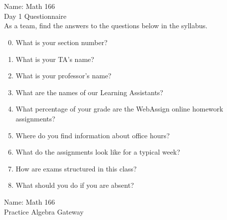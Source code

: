 \documentclass[12pt]{article}
\begin{document}
\pagestyle{empty} %
\section*{}
\noindent Name: \underline{\hspace{2.5 in}}  \hfill Math 166\\
\hfill Day 1 Questionnaire \\


\noindent As a team, find the answers to the questions below in the syllabus. %

\begin{enumerate}
\setcounter{enumi}{-1}
\item What is your section number?
\vfill

\item What is your TA's name?
\vfill

\item What is your professor's name?
\vfill

\item What are the names of our Learning Assistants?
\vfill

\item What percentage of your grade are the WebAssign online homework assignments?
\vfill

\item Where do you find information about office hours?
\vfill

\item What do the assignments look like for a typical week?
\vfill
\vfill

\item How are exams structured in this class?
\vfill
\vfill
\item What should you do if you are absent?
\vfill
\vfill
\end{enumerate}
\newpage
\noindent Name: \underline{\hspace{2.5 in}}  \hfill Math 166\\
\hfill Practice Algebra Gateway \\
\end{document}
